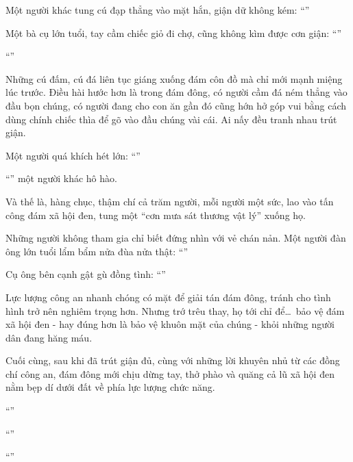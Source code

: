 \documentclass[../main.tex]{subfiles}
\begin{document}
Một người khác tung cú đạp thẳng vào mặt hắn, giận dữ không kém: ``''

Một bà cụ lớn tuổi, tay cầm chiếc giỏ đi chợ, cũng không kìm được cơn giận: ``''

``''

Những cú đấm, cú đá liên tục giáng xuống đám côn đồ mà chỉ mới mạnh miệng lúc trước. Điều hài hước hơn là trong đám đông, có người cầm đá ném thẳng vào đầu bọn chúng, có người đang cho con ăn gần đó cũng hớn hở góp vui bằng cách dùng chính chiếc thìa để gõ vào đầu chúng vài cái. Ai nấy đều tranh nhau trút giận.

Một người quá khích hét lớn: ``''

``'' một người khác hô hào.

Và thế là, hàng chục, thậm chí cả trăm người, mỗi người một sức, lao vào tấn công đám xã hội đen, tung một ``cơn mưa sát thương vật lý'' xuống họ.

Những người không tham gia chỉ biết đứng nhìn với vẻ chán nản. Một người đàn ông lớn tuổi lẩm bẩm nửa đùa nửa thật: ``''

Cụ ông bên cạnh gật gù đồng tình: ``''

Lực lượng công an nhanh chóng có mặt để giải tán đám đông, tránh cho tình hình trở nên nghiêm trọng hơn. Nhưng trớ trêu thay, họ tới chỉ để\dots\ bảo vệ đám xã hội đen - hay đúng hơn là bảo vệ khuôn mặt của chúng - khỏi những người dân đang hăng máu.

Cuối cùng, sau khi đã trút giận đủ, cùng với những lời khuyên nhủ từ các đồng chí công an, đám đông mới chịu dừng tay, thở phào và quăng cả lũ xã hội đen nằm bẹp dí dưới đất về phía lực lượng chức năng.

``''

``''

``''
\end{document}
